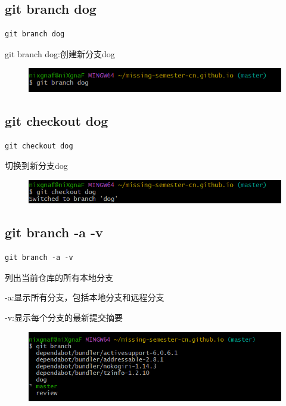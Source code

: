 \documentclass{article}
\begin{document}
\newpage
\subsection{git branch dog}
\lstset{language=bash}
\begin{lstlisting}
git branch dog
\end{lstlisting}

\noindent git branch dog:创建新分支dog
\begin{figure}[h]
    \centering
    \includegraphics[width=1\linewidth]{picture/gitbranch.png}
\end{figure}

\subsection{git checkout dog}
\lstset{language=bash}
\begin{lstlisting}
git checkout dog
\end{lstlisting}

\noindent 切换到新分支dog
\begin{figure}[h]
    \centering
    \includegraphics[width=1\linewidth]{picture/gitcheckout.png}
\end{figure}

\subsection{git branch -a -v}
\lstset{language=bash}
\begin{lstlisting}
git branch -a -v
\end{lstlisting}

\noindent 列出当前仓库的所有本地分支

\noindent -a:显示所有分支，包括本地分支和远程分支

\noindent -v:显示每个分支的最新提交摘要
\begin{figure}[h]
    \centering
    \includegraphics[width=1\linewidth]{picture/gitbrancha.png}
\end{figure}
\end{document}
